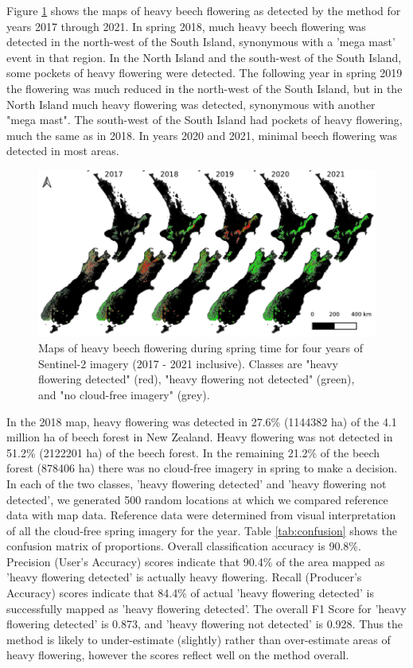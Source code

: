 \documentclass[remotesensing,article,submit,moreauthors,pdftex]{Definitions/mdpi}
\begin{document}
Figure \ref{fig:mapts} shows the maps of heavy beech flowering as detected by the method for years 2017 through 2021. In spring 2018, much heavy beech flowering was detected in the north-west of the South Island, synonymous with a 'mega mast' event in that region. In the North Island and the south-west of the South Island, some pockets of heavy flowering were detected. The following year in spring 2019 the flowering was much reduced in the north-west of the South Island, but in the North Island much heavy flowering was detected, synonymous with another "mega mast". The south-west of the South Island had pockets of heavy flowering, much the same as in 2018. In years 2020 and 2021, minimal beech flowering was detected in most areas. 

\begin{figure}
    \centering
    \includegraphics[width=\textwidth]{images/figure4_timeseries.pdf}
    \caption{Maps of heavy beech flowering during spring time for four years of Sentinel-2 imagery (2017 - 2021 inclusive). Classes are "heavy flowering detected" (red), "heavy flowering not detected" (green), and "no cloud-free imagery" (grey).}
    \label{fig:mapts}
\end{figure}  

In the 2018 map, heavy flowering was detected in 27.6\% (1144382 ha) of the 4.1 million ha of beech forest in New Zealand. Heavy flowering was not detected in 51.2\% (2122201 ha) of the beech forest. In the remaining 21.2\% of the beech forest (878406 ha) there was no cloud-free imagery in spring to make a decision. In each of the two classes, 'heavy flowering detected' and 'heavy flowering not detected', we generated 500 random locations at which we compared reference data with map data. Reference data were determined from visual interpretation of all the cloud-free spring imagery for the year. Table \ref{tab:confusion} shows the confusion matrix of proportions. Overall classification accuracy is 90.8\%. Precision (User's Accuracy) scores indicate that 90.4\% of the area mapped as 'heavy flowering detected' is actually heavy flowering. Recall (Producer's Accuracy) scores indicate that 84.4\% of actual 'heavy flowering detected' is successfully mapped as 'heavy flowering detected'. The overall F1 Score for 'heavy flowering detected' is 0.873, and 'heavy flowering not detected' is 0.928. Thus the \dndyi{} method is likely to under-estimate (slightly) rather than over-estimate areas of heavy flowering, however the scores reflect well on the method overall.
\end{document}
